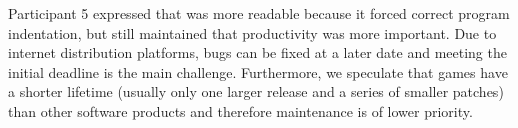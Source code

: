 
Participant 5 expressed that \fs was more readable because it forced correct program indentation, but still maintained that productivity was more important. Due to internet distribution platforms, bugs can be fixed at a later date and meeting the initial deadline is the main challenge. Furthermore, we speculate that games have a shorter lifetime (usually only one larger release and a series of smaller patches) than other software products and therefore maintenance is of lower priority.
